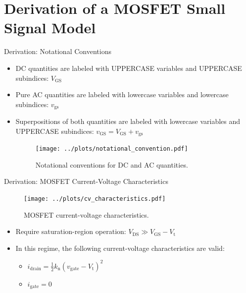 \section{Derivation of a MOSFET Small Signal Model}
\begin{frame}{Derivation: Notational Conventions}
    \begin{itemize}
        \item DC quantities are labeled with UPPERCASE variables and UPPERCASE subindices: 
        $V_{\mathrm{GS}}$
        \item Pure AC quantities are labeled with lowercase variables and lowercase subindices: 
        $v_{\mathrm{gs}}$
        \item Superpositions of both quantities are labeled with lowercase variables and 
        UPPERCASE subindices: $v_{\mathrm{GS}}=V_{\mathrm{GS}}+v_{\mathrm{gs}}$

        \begin{figure}
            \centering
            \texttt{[image: ../plots/notational\_convention.pdf]}
            \caption{Notational conventions for DC and AC quantities.}
            \label{fig:signal_convention}
        \end{figure}
    \end{itemize}
\end{frame}

\begin{frame}{Derivation: MOSFET Current-Voltage Characteristics}
    \vspace{0.5cm}
    \begin{figure}
        \centering
        \texttt{[image: ../plots/cv\_characteristics.pdf]}
        \caption{MOSFET current-voltage characteristics.}
        \label{fig:mosfet_characteristics}
    \end{figure}
    \begin{itemize}
        \item Require saturation-region operation: $V_{\mathrm{DS}}\gg V_{\mathrm{GS}}-V_{\mathrm{t}}$
        \item In this regime, the following current-voltage characteristics are valid:
            \begin{itemize}
                \item $i_{\mathrm{drain}}=\frac{1}{2}k_{\mathrm{n}}(v_{\mathrm{gate}}-V_{\mathrm{t}})^{2}$
                \item $i_{\mathrm{gate}}=0$
            \end{itemize}
    \end{itemize}
\end{frame}

